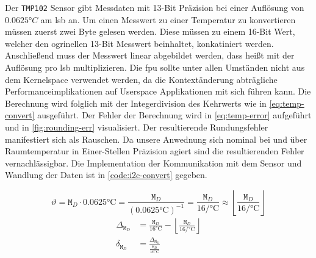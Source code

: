 Der \texttt{TMP102} Sensor gibt Messdaten mit 13-Bit Präzision bei einer Auflösung von $0.0625\si{\degree C}$ am \gls{lsb} an.
Um einen Messwert zu einer Temperatur zu konvertieren müssen zuerst zwei Byte gelesen werden.
Diese müssen zu einem 16-Bit Wert, welcher den ogrinellen 13-Bit Messwert beinhaltet, konkatiniert werden.
Anschlie{\ss}end muss der Messwert linear abgebildet werden, dass hei{\ss}t mit der Auflösung pro \gls{lsb} multiplizieren.
Die \gls{fpu} sollte unter allen Umständen nicht aus dem Kernelspace verwendet werden,
da die Kontextänderung abträgliche Performanceimplikationen auf Userspace Applikationen mit sich führen kann.
Die Berechnung wird folglich mit der Integerdivision des Kehrwerts wie in \autoref{eq:temp-convert} ausgeführt.
Der Fehler der Berechnung wird in \autoref{eq:temp-error} aufgeführt und in \autoref{fig:rounding-err} visualisiert.
Der resultierende Rundungsfehler manifestiert sich als Rauschen.
Da unsere Anwednung sich nominal bei und über Raumtemperatur in Einer-Stellen Präzision agiert sind die resultierenden Fehler vernachlässigbar.
Die Implementation der Kommunikation mit dem Sensor und Wandlung der Daten ist in \autoref{code:i2c-convert} gegeben.

\begin{equation}
    \vartheta = \texttt{M}_D \cdot 0.0625\si{\celsius} = \frac{\texttt{M}_D}{\left(0.0625\si{\celsius}\right)^{-1}} = \frac{\texttt{M}_D}{16\si{\per\celsius}} \approx \left\lfloor\frac{\texttt{M}_D}{16\si{\per\celsius}}\right\rfloor
    \label{eq:temp-convert}
\end{equation}
\begin{equation}
    \begin{aligned}
        \Delta_{\texttt{M}_D} &= \frac{\texttt{M}_D}{16\si{\celsius}} - \left\lfloor\frac{\texttt{M}_D}{16\si{\per\celsius}}\right\rfloor \\[2ex]
        \delta_{\texttt{M}_D} &= \frac{\Delta_{\texttt{M}_D}}{\frac{\texttt{M}_D}{16\si{\celsius}} }\\[2ex]
    \end{aligned}
    \label{eq:temp-error}
\end{equation}



